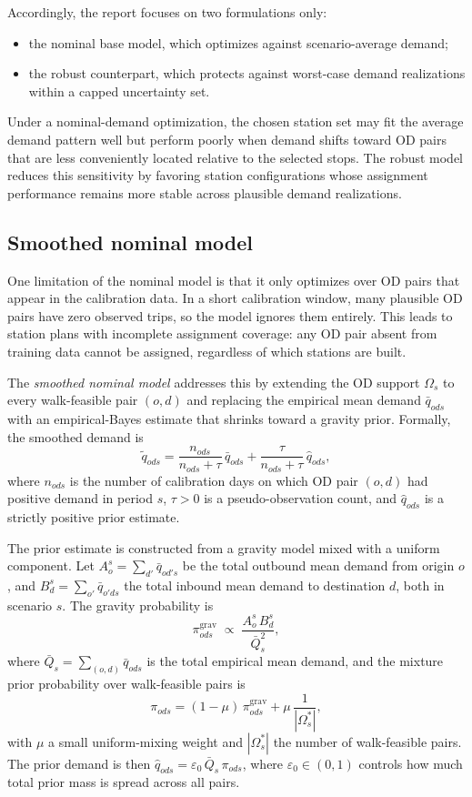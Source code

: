 \documentclass[11pt]{article}
\theoremstyle{definition}
\begin{document}
Accordingly, the report focuses on two formulations only:
\begin{itemize}
	\item the nominal base model, which optimizes against scenario-average demand;
	\item the robust counterpart, which protects against worst-case demand
	      realizations within a capped uncertainty set.
\end{itemize}

Under a nominal-demand optimization, the chosen station set may fit the average
demand pattern well but perform poorly when demand shifts toward OD pairs that
are less conveniently located relative to the selected stops.  The robust model
reduces this sensitivity by favoring station configurations whose assignment
performance remains more stable across plausible demand realizations.

\subsection{Smoothed nominal model}

One limitation of the nominal model is that it only optimizes over OD pairs that
appear in the calibration data.  In a short calibration window, many plausible
OD pairs have zero observed trips, so the model ignores them entirely.
This leads to station plans with incomplete assignment coverage: any OD pair
absent from training data cannot be assigned, regardless of which stations are
built.

The \emph{smoothed nominal model} addresses this by extending the OD support
$\Omega_s$ to every walk-feasible pair $(o,d)$ and replacing the empirical
mean demand $\bar{q}_{ods}$ with an empirical-Bayes estimate that shrinks toward
a gravity prior.  Formally, the smoothed demand is
\begin{equation}
	\tilde{q}_{ods}
	= \frac{n_{ods}}{n_{ods}+\tau}\,\bar{q}_{ods}
	+ \frac{\tau}{n_{ods}+\tau}\,\hat{q}_{ods},
	\label{eq:smoothed-demand}
\end{equation}
where $n_{ods}$ is the number of calibration days on which OD pair $(o,d)$
had positive demand in period $s$, $\tau > 0$ is a pseudo-observation count, and
$\hat{q}_{ods}$ is a strictly positive prior estimate.

The prior estimate is constructed from a gravity model mixed with a uniform
component.  Let $A^s_o = \sum_{d'}\bar{q}_{od's}$ be the total outbound mean
demand from origin $o$, and $B^s_d = \sum_{o'}\bar{q}_{o'ds}$ the total inbound
mean demand to destination $d$, both in scenario $s$.  The gravity probability is
\[
	\pi^{\mathrm{grav}}_{ods}
	\;\propto\;
	\frac{A^s_o\,B^s_d}{\bar{Q}_s^2},
\]
where $\bar{Q}_s = \sum_{(o,d)}\bar{q}_{ods}$ is the total empirical mean demand,
and the mixture prior probability over walk-feasible pairs is
\[
	\pi_{ods}
	= (1-\mu)\,\pi^{\mathrm{grav}}_{ods}
	+ \mu\,\frac{1}{|\Omega^*_s|},
\]
with $\mu$ a small uniform-mixing weight and $|\Omega^*_s|$ the number of
walk-feasible pairs.  The prior demand is then
$\hat{q}_{ods} = \varepsilon_0\,\bar{Q}_s\,\pi_{ods}$, where
$\varepsilon_0 \in (0,1)$ controls how much total prior mass is spread across
all pairs.
\end{document}
